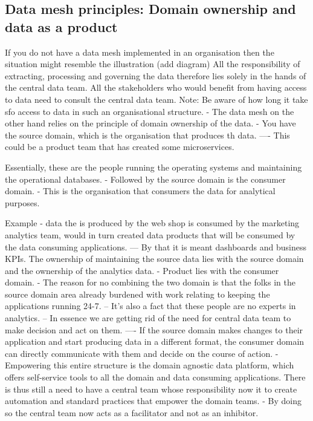 \documentclass[a4paper, 11pt]{article}
\begin{document}
    \subsection{Data mesh principles: Domain ownership and data as a product}
    If you do not have a data mesh implemented in an organisation then the situation might resemble the illustration (add diagram)
    All the responsibility of extracting, processing and governing the data therefore lies solely in the hands of the central data team.
    All the stakeholders who would benefit from having access to data need to consult the central data team.
    Note: Be aware of how long it take sfo access to data in such an organisational structure.
    - The data mesh on the other hand relies on the principle of domain ownership of the data.
    - You have the source domain, which is the organisation that produces th data.
    ---- This could be a product team that has created some microservices.

    Essentially, these are the people running the operating systems and maintaining the operational databases.
    - Followed by the source domain is the consumer domain.
    - This is the organisation that consumers the data for analytical purposes.

    Example - data the is produced by the web shop is consumed by the marketing analytics team, would in turn created data products that will be consumed by the data consuming applications.
    --- By that it is meant dashboards and business KPIs.
    The ownership of maintaining the source data lies with the source domain and the ownership of the analytics data.
    - Product lies with the consumer domain.
    - The reason for no combining the two domain is that the folks in the source domain area already burdened with work relating to keeping the applications running 24-7.
    -- It's also a fact that these people are no experts in analytics.
    -- In essence we are getting rid of the need for central data team to make decision and act on them.
    ---- If the source domain makes changes to their application and start producing data in a different format, the consumer domain can directly communicate with them and decide on the course of action.
    - Empowering this entire structure is the domain agnostic data platform, which offers self-service tools to all the domain and data consuming applications.
    There is thus still a need to have a central team whose responsibility now it to create automation and standard practices that empower the domain teams.
    - By doing so the central team now acts as a facilitator and not as an inhibitor.
\end{document}
